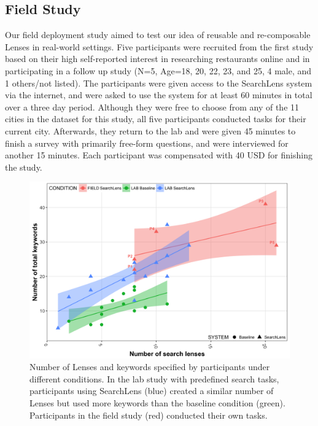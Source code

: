 \subsection{Field Study}

Our field deployment study aimed to test our idea of reusable and re-composable Lenses in real-world settings. Five participants were recruited from the first study based on their high self-reported interest in researching restaurants online and in participating in a follow up study (N=5, Age=18, 20, 22, 23, and 25, 4 male, and 1 others/not listed). The participants were given access to the SearchLens system via the internet, and were asked to use the system for at least 60 minutes in total over a three day period. Although they were free to choose from any of the 11 cities in the dataset for this study, all five participants conducted tasks for their current city.
Afterwards, they return to the lab and were given 45 minutes to finish a survey with primarily free-form questions, and were interviewed for another 15 minutes. Each participant was compensated with 40 USD for finishing the study.

\begin{figure}
    \centering
    \includegraphics[width=0.8\columnwidth]{Chapters/SearchLens/figures/LensKeywordsCount.png}
    \caption[Number of Lenses and keywords under different conditions.]{Number of Lenses and keywords specified by participants under different conditions. In the lab study with predefined search tasks, participants using SearchLens (blue) created a similar number of Lenses but used more keywords than the baseline condition (green). Participants in the field study (red) conducted their own tasks.}
    \label{fig:sl_counts}
\end{figure} 




